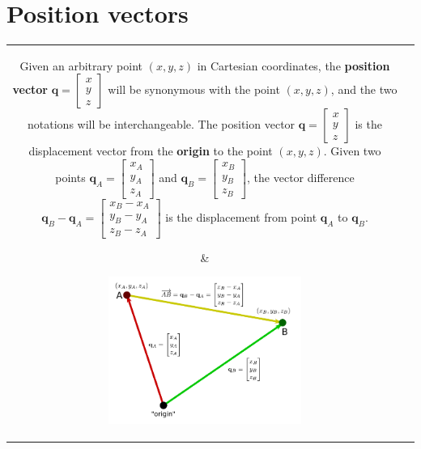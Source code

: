 \documentclass{article}
\begin{document}
\section*{Position vectors}

\begin{tabular}{cc}
\parbox{0.5\textwidth}{
Given an arbitrary point \((x, y, z)\) in Cartesian coordinates, the {\bf position vector} \(\mathbf{q} = \begin{bmatrix} x \\ y \\ z \end{bmatrix}\) will be synonymous with the point \((x, y, z)\), and the two notations will be interchangeable. The position vector \(\mathbf{q} = \begin{bmatrix} x \\ y \\ z \end{bmatrix}\) is the displacement vector from the {\bf origin} to the point \((x,y,z)\). Given two points \(\mathbf{q}_A = \begin{bmatrix} x_A \\ y_A \\ z_A \end{bmatrix}\) and \(\mathbf{q}_B = \begin{bmatrix} x_B \\ y_B \\ z_B \end{bmatrix}\), the vector difference \(\mathbf{q}_B - \mathbf{q}_A = \begin{bmatrix} x_B - x_A \\ y_B - y_A \\ z_B - z_A \end{bmatrix}\) is the displacement from point \(\mathbf{q}_A\) to \(\mathbf{q}_B\). 
} & \parbox{0.5\textwidth}{
\includegraphics[width = 0.5\textwidth]{position_vectors_and_displacements}
}
\end{tabular}

\vspace{5mm}
\end{document}
